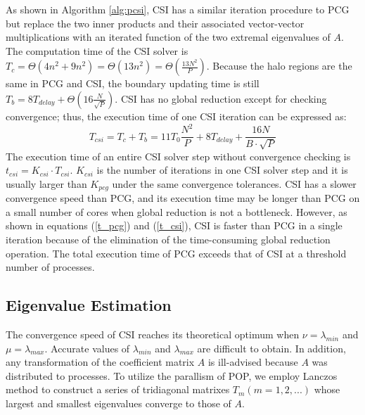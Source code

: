 \documentclass{sig-alternate}
\begin{document}
As shown in Algorithm \ref{alg:pcsi}, CSI has a similar iteration procedure to PCG but replace the two inner products and their associated vector-vector multiplications with an iterated function of the two extremal eigenvalues of $A$. The computation time of the CSI solver is $T_c = \Theta (4 n^2 + 9n^2) = \Theta (13n^2) =\Theta(\frac{13N^2}{P})$. Because the halo regions are the same in PCG and CSI, the boundary updating time is still $T_b =8T_{delay} +\Theta (16 \frac{N}{\sqrt{P}})$. CSI has no global reduction except for checking convergence; thus, the execution time of one CSI iteration can be expressed as:
\begin{equation}
\label{t_csi}
T_{csi} = T_c + T_b
= 11T_0 \frac{N^2}{P}+ 8T_{delay} + \frac{16N}{B \cdot\sqrt{P}}
\end{equation}
The execution time of an entire CSI solver step without convergence checking is $t_{csi} = K_{csi}\cdot T_{csi}$. $K_{csi}$ is the number of iterations in one CSI solver step and it is usually larger than $K_{pcg}$ under the same convergence tolerances.  CSI has a slower convergence speed than PCG, and its execution time may be longer than PCG on a small number of cores when global reduction is not a bottleneck. However, as shown in equations (\ref{t_pcg}) and (\ref{t_csi}), CSI is faster than PCG in a single iteration because of the elimination of the time-consuming global reduction operation.
The total execution time of PCG exceeds that of CSI at a threshold number of processes.

\subsection{Eigenvalue Estimation}
The convergence speed of CSI reaches its theoretical optimum when $\nu = \lambda_{min}$ and $\mu =\lambda_{max}$. Accurate values of $\lambda_{min}$ and $\lambda_{max}$ are difficult to obtain. In addition, any transformation of the coefficient matrix $A$ is ill-advised because $A$ was distributed to processes.
To utilize the parallism of POP, we employ Lanczos method \cite{Paige1980235} to construct a series of tridiagonal matrixes $T_m (m=1,2,...)$ whose largest and smallest eigenvalues converge to those of $A$.
\end{document}
